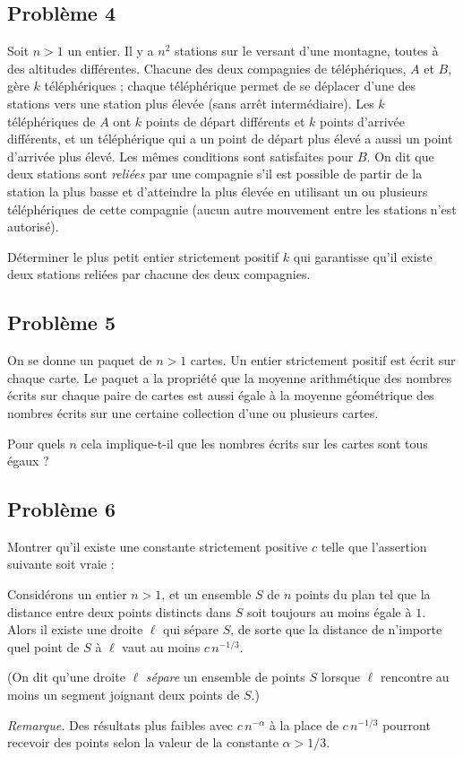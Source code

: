 \subsection*{Problème 4}
Soit $n > 1$ un entier. Il y a $n^2$ stations sur le versant d'une montagne,
toutes à des altitudes différentes. Chacune des deux compagnies de
téléphériques, $A$ et $B$, gère $k$ téléphériques ; chaque téléphérique
permet de se déplacer d'une des stations vers une station plus élevée (sans
arrêt intermédiaire). Les $k$ téléphériques de $A$ ont $k$ points de départ
différents et $k$ points d'arrivée différents, et un téléphérique qui a un
point de départ plus élevé a aussi un point d'arrivée plus élevé. Les mêmes
conditions sont satisfaites pour $B$. On dit que deux stations sont
\emph{reliées} par une compagnie s'il est possible de partir de la station la
plus basse et d'atteindre la plus élevée en utilisant un ou plusieurs
téléphériques de cette compagnie (aucun autre mouvement entre les stations
n'est autorisé).

Déterminer le plus petit entier strictement positif $k$ qui garantisse qu'il
existe deux stations reliées par chacune des deux compagnies.

\subsection*{Problème 5}
On se donne un paquet de $n > 1$ cartes. Un entier strictement positif est
écrit sur chaque carte. Le paquet a la propriété que la moyenne arithmétique
des nombres écrits sur chaque paire de cartes est aussi égale à la moyenne
géométrique des nombres écrits sur une certaine collection d'une ou plusieurs
cartes.

Pour quels $n$ cela implique-t-il que les nombres écrits sur les cartes sont
tous égaux ?

\subsection*{Problème 6}
Montrer qu'il existe une constante strictement positive $c$ telle que
l'assertion suivante soit vraie :

Considérons un entier $n > 1$, et un ensemble $S$ de $n$ points du plan tel
que la distance entre deux points distincts dans $S$ soit toujours au moins
égale à $1$. Alors il existe une droite $\ell$ qui sépare $S$, de sorte que la
distance de n'importe quel point de $S$ à $\ell$ vaut au moins $c\, n^{-1/3}$.

(On dit qu'une droite $\ell$ \emph{sépare} un ensemble de points $S$ lorsque
$\ell$ rencontre au moins un segment joignant deux points de $S$.)

\medskip
\emph{Remarque.} Des résultats plus faibles avec $c\, n^{-\alpha}$ à la place
de $c\, n^{-1/3}$ pourront recevoir des points selon la valeur de la constante
$\alpha > 1/3$.
